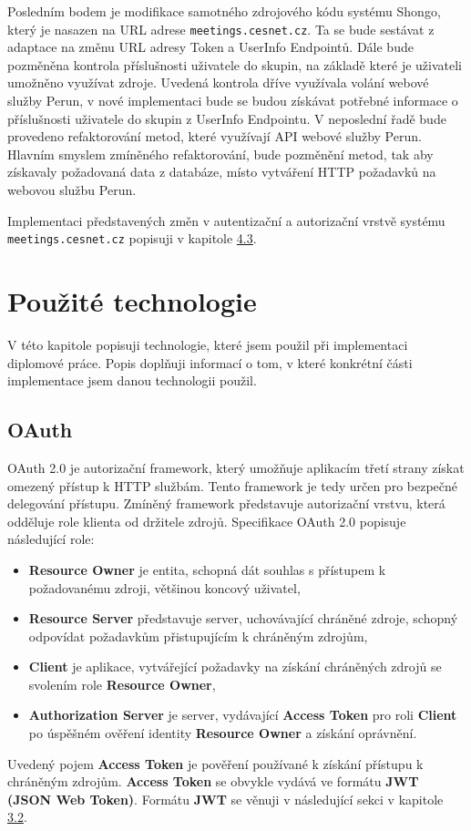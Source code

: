 \documentclass[
  printed, %
  twoside, %
  table,   %
  nolof,     %
  nolot,     %
]{fithesis3}
\begin{document}
Posledním bodem je modifikace samotného zdrojového kódu systému Shongo, který je nasazen na URL adrese \texttt{meetings.cesnet.cz}. Ta se bude sestávat z adaptace na změnu URL adresy Token a UserInfo Endpointů. Dále bude pozměněna kontrola příslušnosti uživatele do skupin, na základě které je uživateli umožněno využívat zdroje. Uvedená kontrola dříve využívala volání webové služby Perun, v nové implementaci bude se budou získávat potřebné informace o příslušnosti uživatele do skupin z UserInfo Endpointu. V neposlední řadě bude provedeno refaktorování metod, které využívají API webové služby Perun. Hlavním smyslem zmíněného refaktorování, bude pozměnění metod, tak aby získavaly požadovaná data z databáze, místo vytváření HTTP požadavků na webovou službu Perun. 

\par 

Implementaci představených změn v autentizační a autorizační vrstvě systému \texttt{meetings.cesnet.cz} popisuji v kapitole \hyperref[ShongoImpl]{4.3}.

\chapter{Použité technologie}
V této kapitole popisuji technologie, které jsem použil při implementaci diplomové práce. Popis doplňuji informací o tom, v které konkrétní části implementace jsem danou technologii použil.
\section{OAuth}
\label{sec:oauth}
OAuth 2.0 \cite{rfc6749} je autorizační framework, který umožňuje aplikacím třetí strany získat omezený přístup k HTTP službám. Tento framework je tedy určen pro bezpečné delegování přístupu. Zmíněný framework představuje autorizační vrstvu, která odděluje role klienta od držitele zdrojů. Specifikace OAuth 2.0 popisuje následující role: 
\begin{itemize}
    \item \textbf{Resource Owner} je entita, schopná dát souhlas s přístupem k požadovanému zdroji, většinou koncový uživatel,
    \item \textbf{Resource Server} představuje server, uchovávající chráněné zdroje, schopný odpovídat požadavkům přistupujícím k chráněným zdrojům,
    \item \textbf{Client} je aplikace, vytvářející požadavky na získání chráněných zdrojů se svolením role \textbf{Resource Owner},
    \item \textbf{Authorization Server} je server, vydávající \textbf{Access Token} pro roli \textbf{Client} po úspěšném ověření identity \textbf{Resource Owner} a získání oprávnění.
\end{itemize}
Uvedený pojem \textbf{Access Token} je pověření používané k získání přístupu k chráněným zdrojům. \textbf{Access Token} se obvykle vydává ve formátu \textbf{JWT (JSON Web Token)}. Formátu \textbf{JWT} se věnuji v následující sekci v kapitole \hyperref[sec:oidc]{3.2}.  \par
\end{document}
